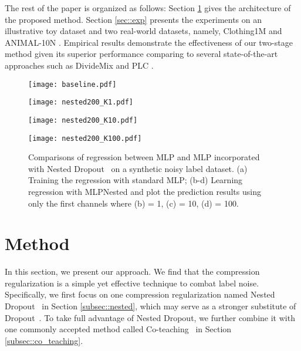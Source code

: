 \documentclass[final]{cvpr}
\begin{document}
The rest of the paper is organized as follows: 
Section \ref{sec::method} gives the architecture of the proposed method. 
Section \ref{sec::exp} presents the experiments on an illustrative toy dataset and two real-world datasets, namely, Clothing1M \cite{xiao2015learning} and ANIMAL-10N \cite{song2019selfie}. 
Empirical results demonstrate the effectiveness of our two-stage method given its superior performance comparing to several state-of-the-art approaches such as DivideMix \cite{li2020dividemix} and PLC \cite{zhang2021learning}.


\begin{figure*}[t]
	\begin{minipage}[t]{0.24\textwidth}  
		\centering 
		\addtocounter{figure}{-1}
		\texttt{[image: baseline.pdf]}
        \captionsetup{labelformat=empty}
		\caption{(a) MLP}
	\end{minipage}  
	\begin{minipage}[t]{0.24\textwidth}  
		\centering  
		\addtocounter{figure}{-1}
		\texttt{[image: nested200\_K1.pdf]} 
		\captionsetup{labelformat=empty}
        \caption{(b) MLPNested =1}
	\end{minipage} 
	\begin{minipage}[t]{0.24\textwidth}  
		\centering  
		\addtocounter{figure}{-1}
		\texttt{[image: nested200\_K10.pdf]} 
		\captionsetup{labelformat=empty}
        \caption{(c) MLPNested =10}
	\end{minipage} 
	\begin{minipage}[t]{0.24\textwidth}  
		\centering  
		\addtocounter{figure}{-1}
		\texttt{[image: nested200\_K100.pdf]}
        \captionsetup{labelformat=empty}
		\caption{(d) MLPNested =100}
	\end{minipage}  
	\centering  
	\caption{Comparisons of regression between MLP and MLP incorporated with Nested Dropout~\cite{rippel2014learning} on a synthetic noisy label dataset. 
	(a) Training the regression with standard MLP; (b-d) Learning regression with MLPNested and plot the prediction results using only the first  channels where (b)  = 1, (c)  = 10, (d)  = 100.}
	\label{fig::ResistNoise}
\end{figure*} 

\section{Method} \label{sec::method}
In this section, we present our approach. We find that the compression regularization is a simple yet effective technique to combat label noise. 
Specifically, we first focus on one compression regularization named Nested Dropout~\cite{rippel2014learning} in Section \ref{subsec::nested}, which may serve as a stronger substitute of Dropout~\cite{srivastava2014dropout}.
To take full advantage of Nested Dropout, we further combine it with one commonly accepted method called Co-teaching~\cite{han2018co} in Section \ref{subsec::co_teaching}. 
\end{document}
